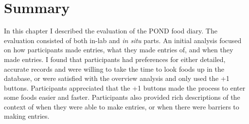 \section{Summary}
In this chapter I described the evaluation of the POND food diary. The evaluation consisted of both in-lab and \textit{in situ} parts. An initial analysis focused on how participants made entries, what they made entries of, and when they made entries. I found that participants had preferences for either detailed, accurate records and were willing to take the time to look foods up in the database, or were satisfied with the overview analysis and only used the +1 buttons. Participants appreciated that the +1 buttons made the process to enter some foods easier and faster. Participants also provided rich descriptions of the context of when they were able to make entries, or when there were barriers to making entries. 

